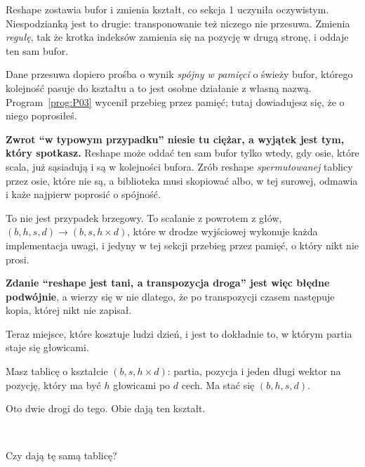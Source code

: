 \begin{fr}
Reshape zostawia bufor i zmienia kształt, co sekcja 1 uczyniła oczywistym.
Niespodzianką jest to drugie: transponowanie też niczego nie przesuwa. Zmienia
\emph{regułę}, tak że krotka indeksów zamienia się na pozycję w drugą stronę, i
oddaje ten sam bufor.

Dane przesuwa dopiero prośba o wynik \emph{spójny w pamięci} \dash{} o świeży
bufor, którego kolejność pasuje do kształtu \dash{} a to jest osobne działanie
z własną nazwą. Program~\ref{prog:P03} wycenił przebieg przez pamięć; tutaj
dowiadujesz się, że o niego poprosiłeś.

\begin{warning}
\textbf{Zwrot \enquote{w typowym przypadku} niesie tu ciężar, a wyjątek jest
tym, który spotkasz.} Reshape może oddać ten sam bufor tylko wtedy, gdy osie,
które scala, już sąsiadują i są w kolejności bufora. Zrób reshape
\emph{spermutowanej} tablicy przez osie, które nie są, a biblioteka musi
skopiować \dash{} albo, w tej surowej, odmawia i każe najpierw poprosić o
spójność.

To nie jest przypadek brzegowy. To scalanie z powrotem z głów, $(b, h, s, d)
\rightarrow (b, s, h \times d)$, które w drodze wyjściowej wykonuje każda
implementacja uwagi, i jedyny w tej sekcji przebieg przez pamięć, o który nikt
nie prosi.
\end{warning}

\textbf{Zdanie \enquote{reshape jest tani, a transpozycja droga} jest więc
błędne podwójnie}, a wierzy się w nie dlatego, że po transpozycji czasem
następuje kopia, której nikt nie zapisał.
\end{fr}

\begin{fr}
Teraz miejsce, które kosztuje ludzi dzień, i jest to dokładnie to, w którym
partia staje się głowicami.

Masz tablicę o kształcie $(b, s, h \times d)$: partia, pozycja i jeden długi
wektor na pozycję, który ma być $h$ głowicami po $d$ cech. Ma stać się
$(b, h, s, d)$.

Oto dwie drogi do tego. Obie dają ten kształt.

\begin{center}
 \\[2pt]
\end{center}

Czy dają tę samą tablicę?
\dotline
\nextframe
\end{fr}

